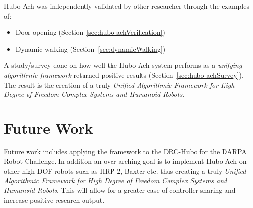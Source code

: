 Hubo-Ach was independently validated by other researcher through the examples of:
\begin{itemize}
	\item Door opening (Section~\ref{sec:hubo-achVerification})
	\item Dynamic walking (Section~\ref{sec:dynamicWalking})
\end{itemize}

A study/survey done on how well the Hubo-Ach system performs as a \textit{unifying algorithmic framework} returned positive results (Section~\ref{sec:hubo-achSurvey}).
The result is the creation of a truly \textit{Unified Algorithmic Framework for High Degree of Freedom Complex Systems and Humanoid Robots}.

\section{Future Work}
Future work includes applying the framework to the DRC-Hubo for the DARPA Robot Challenge.
In addition an over arching goal is to implement Hubo-Ach on other high DOF robots such as HRP-2, Baxter etc. thus creating a truly \textit{Unified Algorithmic Framework for High Degree of Freedom Complex Systems and Humanoid Robots}.
This will allow for a greater ease of controller sharing and increase positive research output.



